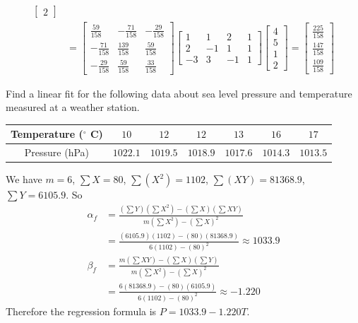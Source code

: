 \begin{Answer}
\begin{align*}
\begin{bmatrix}
2
\end{bmatrix} \\
&=
\begin{bmatrix}
\frac{59}{158}&-\frac{71}{158}&-\frac{29}{158}\\
-\frac{71}{158}&\frac{139}{158}&\frac{59}{158}\\ 
-\frac{29}{158}&\frac{59}{158}&\frac{33}{158}
\end{bmatrix}
\begin{bmatrix}
1 & 1 & 2 & 1 \\
2 & -1 & 1 & 1 \\
-3 & 3 & -1 & 1
\end{bmatrix}
\begin{bmatrix}
4 \\
5 \\
1 \\
2
\end{bmatrix} 
=
\begin{bmatrix}
\frac{225}{158}\\ 
\frac{147}{158}\\ 
\frac{109}{158}
\end{bmatrix}
\end{align*}    
\end{Answer}

\begin{Exercise}
Find a linear fit for the following data about sea level pressure and temperature measured at a weather station.
\begin{center}
\begin{tabular}{|c|c|c|c|c|c|c|}
\hline
Temperature ($^\circ$ C) & $10$ & $12$ & $12$ & $13$ & $16$ & $17$\\
\hline
Pressure (hPa) & $1022.1$ & $1019.5$ & $1018.9$ & $1017.6$ & $1014.3$ & $1013.5$\\
\hline
\end{tabular}
\end{center}
\end{Exercise}
\begin{Answer}
We have $m=6$, $\sum X=80$, $\sum (X^2)=1102$, $\sum (XY)=81368.9$, $\sum Y=6105.9$. So
\begin{align*}
\alpha_f &= \frac{(\sum Y) (\sum X^2) - (\sum X) (\sum XY)}{m(\sum X^2) - (\sum X)^2} \\
&= \frac{(6105.9) (1102) - (80) (81368.9)}{6(1102) - (80)^2} \approx 1033.9 \\
\beta_f &= \frac{m (\sum XY) - (\sum X) (\sum Y)}{m(\sum X^2) - (\sum X)^2} \\
&= \frac{6 (81368.9) - (80) (6105.9)}{6(1102) - (80)^2} \approx -1.220
\end{align*}
Therefore the regression formula is $P = 1033.9 - 1.220T$. 
\end{Answer}

